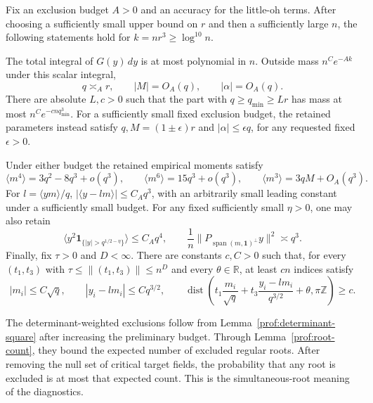 \begin{proposition}\label{prof:scalar-diagnostics}
Fix an exclusion budget $A>0$ and an accuracy for the little-oh terms.
After choosing a sufficiently small upper bound on $r$ and then a
sufficiently large $n$, the following statements hold for
$k=nr^3\ge\log^{10}n$.

The total integral of $G(y)\,dy$ is at most polynomial in $n$. Outside
mass $n^Ce^{-Ak}$ under this scalar integral,
\[
 q\asymp_A r,\qquad |M|=O_A(q),\qquad |\alpha|=O_A(q).
\]
There are absolute $L,c>0$ such that the part with
$q\ge q_{\min}\ge Lr$ has mass at most
$n^Ce^{-cnq_{\min}^3}$. For a sufficiently small fixed exclusion
budget, the retained parameters instead satisfy
$q,M=(1\pm\epsilon)r$ and $|\alpha|\le\epsilon q$, for any requested
fixed $\epsilon>0$.

Under either budget the retained empirical moments satisfy
\begin{equation}\label{prof:eq9}
 \langle m^4\rangle=3q^2-8q^3+o(q^3),\qquad
 \langle m^6\rangle=15q^3+o(q^3),\qquad
 \langle m^3\rangle=3qM+O_A(q^3).
\end{equation}
For $l=\langle ym\rangle/q$,
$|\langle y-lm\rangle|\le C_Aq^3$, with an arbitrarily small leading
constant under a sufficiently small budget. For any fixed sufficiently
small $\eta>0$, one may also retain
\[
 \langle y^2\mathbf1_{\{|y|>q^{1/2-\eta}\}}\rangle\le C_Aq^4,
 \qquad
 \frac1n\|P_{\operatorname{span}(m,\mathbf1)^\perp}y\|^2\asymp q^3.
\]
Finally, fix $\tau>0$ and $D<\infty$. There are constants $c,C>0$
such that, for every $(t_1,t_3)$ with
$\tau\le\|(t_1,t_3)\|\le n^D$ and every $\theta\in\mathbb R$, at
least $cn$ indices satisfy
\[
 |m_i|\le C\sqrt q,\qquad |y_i-lm_i|\le Cq^{3/2},\qquad
 \operatorname{dist}\left(
 t_1\frac{m_i}{\sqrt q}+t_3\frac{y_i-lm_i}{q^{3/2}}+\theta,
 \pi\mathbb Z\right)\ge c.
\]

The determinant-weighted exclusions follow from
Lemma~\ref{prof:determinant-square} after increasing the preliminary
budget. Through Lemma~\ref{prof:root-count}, they bound the expected
number of excluded regular roots. After removing the null set of
critical target fields, the probability that any root is excluded is
at most that expected count. This is the simultaneous-root meaning of
the diagnostics.
\end{proposition}

